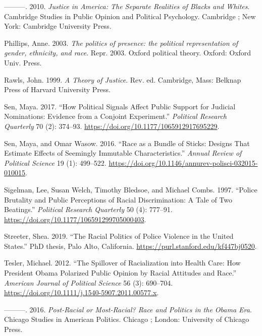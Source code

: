 \documentclass[
  12pt,
]{article}
\newlength{\cslhangindent}
\newlength{\cslentryspacingunit} %
\newenvironment{CSLReferences}[2] %
 {%
  \setlength{\parindent}{0pt}
  \ifodd #1
  \let\oldpar\par
  \def\par{\hangindent=\cslhangindent\oldpar}
  \fi
  \setlength{\parskip}{#2\cslentryspacingunit}
 }%
 {}
\begin{document}
\begin{CSLReferences}{1}{0}
\leavevmode{}%
---------. 2010. \emph{Justice in America: The Separate Realities of
Blacks and Whites}. Cambridge Studies in Public Opinion and Political
Psychology. Cambridge ; New York: Cambridge University Press.

\leavevmode{}%
Phillips, Anne. 2003. \emph{The politics of presence: the political
representation of gender, ethnicity, and race}. Repr. 2003. Oxford
political theory. Oxford: Oxford Univ. Press.

\leavevmode{}%
Rawls, John. 1999. \emph{A Theory of Justice}. Rev. ed. Cambridge, Mass:
Belknap Press of Harvard University Press.

\leavevmode{}%
Sen, Maya. 2017. {``How Political Signals Affect Public Support for
Judicial Nominations: Evidence from a Conjoint Experiment.''}
\emph{Political Research Quarterly} 70 (2): 374--93.
\url{https://doi.org/10.1177/1065912917695229}.

\leavevmode{}%
Sen, Maya, and Omar Wasow. 2016. {``Race as a Bundle of Sticks: Designs
That Estimate Effects of Seemingly Immutable Characteristics.''}
\emph{Annual Review of Political Science} 19 (1): 499--522.
\url{https://doi.org/10.1146/annurev-polisci-032015-010015}.

\leavevmode{}%
Sigelman, Lee, Susan Welch, Timothy Bledsoe, and Michael Combs. 1997.
{``Police Brutality and Public Perceptions of Racial Discrimination: A
Tale of Two Beatings.''} \emph{Political Research Quarterly} 50 (4):
777--91. \url{https://doi.org/10.1177/106591299705000403}.

\leavevmode{}%
Streeter, Shea. 2019. {``The Racial Politics of Police Violence in the
United States.''} PhD thesis, Palo Alto, California.
\url{https://purl.stanford.edu/kf447bj0520}.

\leavevmode{}%
Tesler, Michael. 2012. {``The Spillover of Racialization into Health
Care: How President Obama Polarized Public Opinion by Racial Attitudes
and Race.''} \emph{American Journal of Political Science} 56 (3):
690--704. \url{https://doi.org/10.1111/j.1540-5907.2011.00577.x}.

\leavevmode{}%
---------. 2016. \emph{Post-Racial or Most-Racial? Race and Politics in
the Obama Era}. Chicago Studies in American Politics. Chicago ; London:
University of Chicago Press.


\end{CSLReferences}
\end{document}
